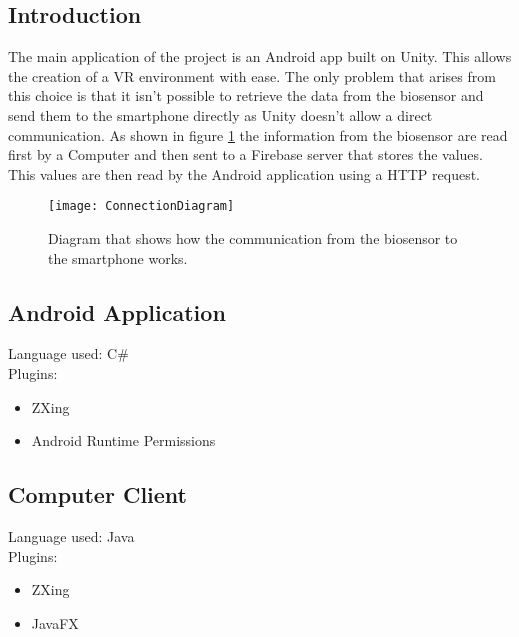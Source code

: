 \subsection{Introduction}
The main application of the project is an Android app built on Unity. This allows the creation of a VR environment with ease. The only problem that arises from this choice is that it isn't possible to retrieve the data from the biosensor and send them to the smartphone directly as Unity doesn't allow a direct communication. As shown in figure \ref{fig:communication} the information from the biosensor are read first by a Computer and then sent to a Firebase server that stores the values. This values are then read by the Android application using a HTTP request.
\begin{figure}[h]
	\centering
	\texttt{[image: ConnectionDiagram]}
	\caption{Diagram that shows how the communication from the biosensor to the smartphone works.}\label{fig:communication}
\end{figure}

\subsection{Android Application}
Language used: C\#\\
Plugins:
\begin{itemize}
	\item ZXing
	\item Android Runtime Permissions
\end{itemize}

\subsection{Computer Client}
Language used: Java\\
Plugins:
\begin{itemize}
	\item ZXing
	\item JavaFX
\end{itemize}


